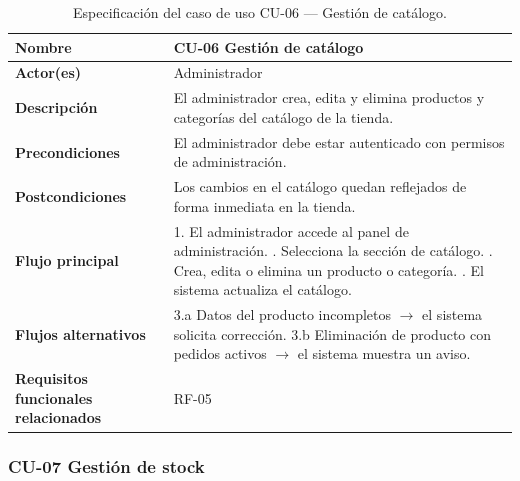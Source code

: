 \begin{table}[H]
\centering
\small
\begin{tabular}{|m{}|m{}|}
\hline
\textbf{Nombre} & CU-06 Gestión de catálogo \\ \hline
\textbf{Actor(es)} & Administrador \\ \hline
\textbf{Descripción} & El administrador crea, edita y elimina productos y categorías del catálogo de la tienda. \\ \hline
\textbf{Precondiciones} & El administrador debe estar autenticado con permisos de administración. \\ \hline
\textbf{Postcondiciones} & Los cambios en el catálogo quedan reflejados de forma inmediata en la tienda. \\ \hline
\textbf{Flujo principal} & 1. El administrador accede al panel de administración. \newline 2. Selecciona la sección de catálogo. \newline 3. Crea, edita o elimina un producto o categoría. \newline 4. El sistema actualiza el catálogo. \\ \hline
\textbf{Flujos alternativos} & 3.a Datos del producto incompletos $\rightarrow$ el sistema solicita corrección. \newline 3.b Eliminación de producto con pedidos activos $\rightarrow$ el sistema muestra un aviso. \\ \hline
\textbf{Requisitos funcionales relacionados} & RF-05 \\ \hline
\end{tabular}
\caption{Especificación del caso de uso CU-06 — Gestión de catálogo.}
\end{table}

\subsubsection{CU-07 Gestión de stock}

